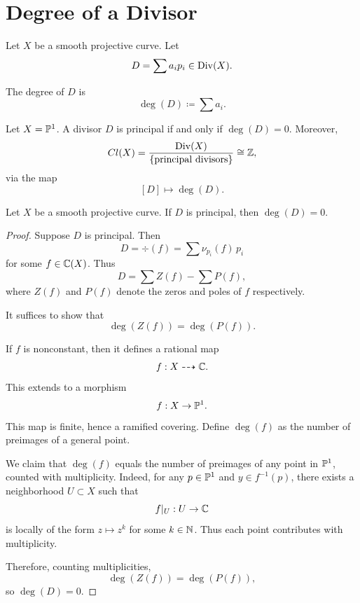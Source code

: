 
\section{Degree of a Divisor}

Let $X$ be a smooth projective curve.
Let
\[
    D = \sum a_i p_i \in \mathrm{Div}(X).
\]

\begin{definition}
    The degree of $D$ is
    \[
        \deg(D) \coloneqq \sum a_i.
    \]
\end{definition}

Let $X = \mathbb{P}^1$.
A divisor $D$ is principal if and only if $\deg(D) = 0$.
Moreover,
\[
    Cl(X) = \dfrac{\mathrm{Div}(X)}{\{\text{principal divisors}\}} \cong \mathbb{Z},
\]
via the map
\[
    [D] \mapsto \deg(D).
\]

\begin{theorem*}{
    Let $X$ be a smooth projective curve.
    If $D$ is principal, then $\deg(D) = 0$.
}
\end{theorem*}

\begin{proof}
    Suppose $D$ is principal.
    Then
    \[
        D = \div(f) = \sum \nu_{p_i}(f)\, p_i
    \]
    for some $f \in \mathbb{C}(X)$.
    Thus
    \[
        D = \sum Z(f) - \sum P(f),
    \]
    where $Z(f)$ and $P(f)$ denote the zeros and poles of $f$ respectively.

    It suffices to show that
    \[
        \deg(Z(f)) = \deg(P(f)).
    \]

    If $f$ is nonconstant, then it defines a rational map
    \[
        f : X \dashrightarrow \mathbb{C}.
    \]
    This extends to a morphism
    \[
        f : X \to \mathbb{P}^1.
    \]
    This map is finite, hence a ramified covering.
    Define $\deg(f)$ as the number of preimages of a general point.

    We claim that $\deg(f)$ equals the number of preimages of any point in $\mathbb{P}^1$, counted with multiplicity.
    Indeed, for any $p \in \mathbb{P}^1$ and $y \in f^{-1}(p)$, there exists a neighborhood $U \subset X$ such that
    \[
        f|_U : U \to \mathbb{C}
    \]
    is locally of the form $z \mapsto z^k$ for some $k \in \mathbb{N}$.
    Thus each point contributes with multiplicity.

    Therefore, counting multiplicities,
    \[
        \deg(Z(f)) = \deg(P(f)),
    \]
    so $\deg(D) = 0$.
\end{proof}

